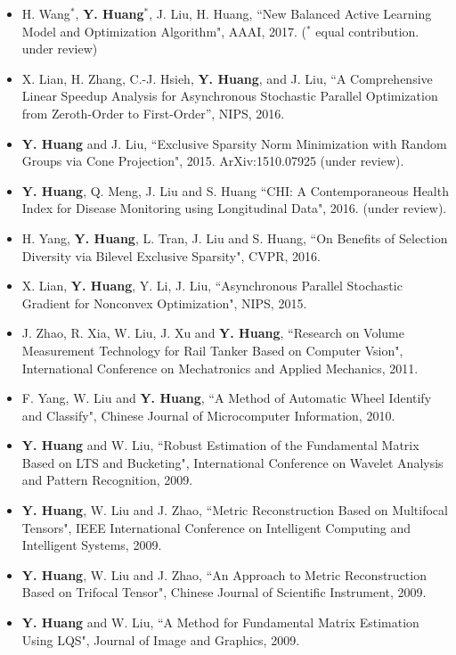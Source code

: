 \documentclass[11pt]{res} %
\begin{document}
\begin{resume}
\begin{itemize}
\item H. Wang$^*$, \textbf{Y. Huang}$^*$, J. Liu, H. Huang, ``New Balanced Active Learning Model and Optimization Algorithm", AAAI, 2017. ($^*$ equal contribution. under review)
\item X. Lian, H. Zhang, C.-J. Hsieh, \textbf{Y. Huang}, and J. Liu, ``A Comprehensive Linear Speedup Analysis for Asynchronous Stochastic Parallel Optimization from Zeroth-Order to First-Order'', NIPS, 2016.
\item \textbf{Y. Huang} and J. Liu, ``Exclusive Sparsity Norm Minimization with Random Groups via Cone Projection", 2015. ArXiv:1510.07925 (under review).
\item \textbf{Y. Huang}, Q. Meng, J. Liu and S. Huang ``CHI: A Contemporaneous Health Index for Disease Monitoring using Longitudinal Data", 2016. (under review).
\item H. Yang, \textbf{Y. Huang}, L. Tran, J. Liu and S. Huang, ``On Benefits of Selection Diversity via Bilevel Exclusive Sparsity", CVPR, 2016.
\item X. Lian, \textbf{Y. Huang}, Y. Li, J. Liu, ``Asynchronous Parallel Stochastic Gradient for Nonconvex Optimization", NIPS, 2015.
\item J. Zhao, R. Xia, W. Liu, J. Xu and \textbf{Y. Huang}, ``Research on Volume Measurement Technology for Rail Tanker Based on Computer Vsion", International Conference on Mechatronics and Applied Mechanics, 2011. 
\item F. Yang, W. Liu and \textbf{Y. Huang}, ``A Method of Automatic Wheel Identify and Classify", Chinese Journal of Microcomputer Information, 2010. 
\item \textbf{Y. Huang} and W. Liu, ``Robust Estimation of the Fundamental Matrix Based on LTS and Bucketing", International Conference on Wavelet Analysis and Pattern Recognition, 2009.
\item \textbf{Y. Huang}, W. Liu and J. Zhao, ``Metric Reconstruction Based on Multifocal Tensors", IEEE International Conference on Intelligent Computing and Intelligent Systems, 2009. 
\item \textbf{Y. Huang}, W. Liu and J. Zhao, ``An Approach to Metric Reconstruction Based on Trifocal Tensor", Chinese Journal of Scientific Instrument, 2009. 
\item \textbf{Y. Huang} and W. Liu, ``A Method for Fundamental Matrix Estimation Using LQS", Journal of Image and Graphics, 2009. 
\end{itemize}

\vspace{0.2in} %


\end{resume}
\end{document}
